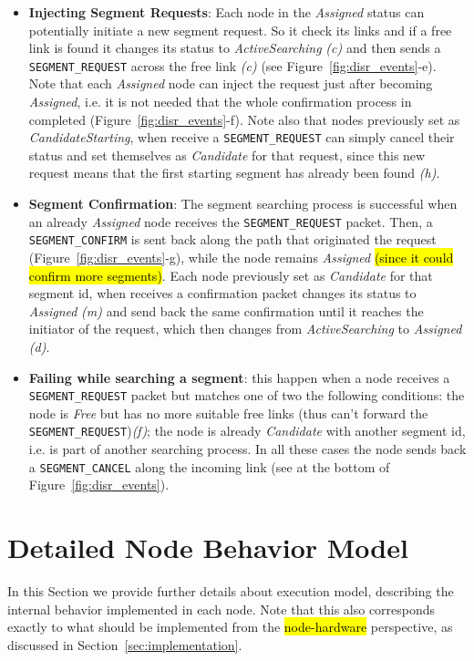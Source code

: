 \begin{itemize}
\item{\textbf{Injecting Segment Requests}}: Each node in the
\emph{Assigned} status can potentially initiate a new segment request.
So it check its links and if a free link is found it changes its
status to \emph{ActiveSearching} \emph{(c)} and then sends
a \texttt{SEGMENT\_REQUEST} across the free link \emph{(c)} (see
Figure~\ref{fig:disr_events}-e). 
Note that each \emph{Assigned} node can inject the request just after
becoming \emph{Assigned}, i.e. it is not needed that the whole confirmation
process in completed (Figure~\ref{fig:disr_events}-f).
Note also that nodes previously set as \emph{CandidateStarting}, when receive
a \texttt{SEGMENT\_REQUEST} can simply cancel their
status and set themselves as \emph{Candidate} for that request, since this new
request means that the first starting segment has already been found \emph{(h)}. 
\item{\textbf{Segment Confirmation}}: The segment searching process is successful
when an already \emph{Assigned} node receives the
\texttt{SEGMENT\_REQUEST} packet. Then, a \texttt{SEGMENT\_CONFIRM} is
sent back along the path that originated the request
(Figure~\ref{fig:disr_events}-g), while the
node remains \emph{Assigned} \hl{(since it could confirm more segments)}. Each node
previously set as \emph{Candidate} for that segment id, when receives a confirmation packet changes its status to \emph{Assigned} \emph{(m)} and send back
the same confirmation until it reaches the initiator of the request,
which then changes from \emph{ActiveSearching} to \emph{Assigned} \emph{(d)}.

\item{\textbf{Failing while searching a segment}}: this happen when a node receives a \texttt{SEGMENT\_REQUEST} packet but
matches one of two the following conditions: the node is \emph{Free} but has no
more suitable free links (thus can’t forward the
\texttt{SEGMENT\_REQUEST})\emph{(f)}; the node
is already \emph{Candidate} with another segment id, i.e. is part of another searching process. In all these cases the node
sends back a \texttt{SEGMENT\_CANCEL} along the incoming link (see at
the bottom of Figure~\ref{fig:disr_events}).
\end{itemize}


\section{Detailed Node Behavior Model}
\label{sec:execution_model}

In this Section we provide further details about \disr{}
execution model, describing the internal behavior implemented in
each node. Note that this also corresponds exactly to what should be
implemented from the \hl{node-hardware} perspective, as discussed in
Section~\ref{sec:implementation}.

